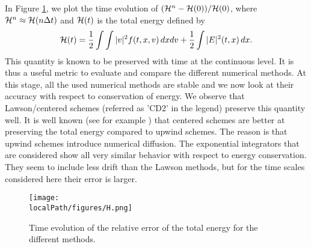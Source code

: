 In Figure \ref{total_energy}, we plot the time evolution of $({\cal H}^n -{\cal H}(0))/{\cal H}(0)$, where ${\cal H}^n\approx {\cal H}(n\Delta t)$ and ${\cal H}(t)$ is the total energy defined by 
$$
{\cal H}(t) = \frac{1}{2}\int\int |v|^2 f(t, x, v) \,dxdv + \frac{1}{2}\int |E|^2(t, x) \,dx. 
$$
This quantity is known to be preserved with time {\color{black} at the continuous level. It is thus a useful metric to evaluate and compare the different numerical 
methods. At this stage, all the used numerical methods are stable and we now look at their accuracy with respect to conservation of energy. }
We observe that Lawson/centered schemes (referred as 'CD2' in the 
legend) preserve this quantity well. It is well known (see for example \cite{cf}) that centered schemes are better at preserving the total energy compared to upwind schemes. The reason is that upwind schemes introduce numerical diffusion. The exponential integrators that are considered show all very similar behavior with respect to energy conservation. They seem to include less drift than the Lawson methods, but for the time scales considered here their error is larger.

\begin{figure}%
	\centering
  \texttt{[image: \\localPath/figures/H.png]}
	\caption{Time evolution of the relative error of the total energy for the different methods. }
	\label{total_energy}
\end{figure}

